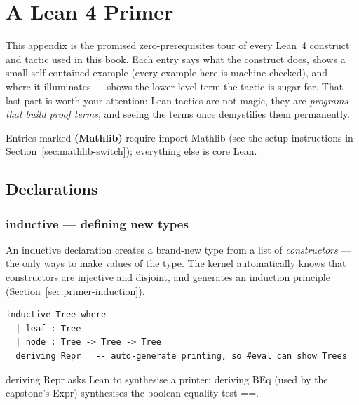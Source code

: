 \documentclass[12pt, openany]{book}
\theoremstyle{plain}
\theoremstyle{definition}
\theoremstyle{remark}
\newcommand{\li}[1]{{\ttfamily\small\color{tealaccent}#1}}
\begin{document}
\appendix

\chapter{A Lean 4 Primer}\label{app:primer}
\color{black}

This appendix is the promised zero-prerequisites tour of every Lean~4 construct and tactic used in this book.  Each entry says what the construct does, shows a small self-contained example (every example here is machine-checked), and --- where it illuminates --- shows the lower-level term the tactic is sugar for.  That last part is worth your attention: Lean tactics are not magic, they are \emph{programs that build proof terms}, and seeing the terms once demystifies them permanently.

Entries marked \textbf{(Mathlib)} require \li{import Mathlib} (see the setup instructions in Section~\ref{sec:mathlib-switch}); everything else is core Lean.

\section{Declarations}

\subsection*{\li{inductive} --- defining new types}

An \li{inductive} declaration creates a brand-new type from a list of \emph{constructors} --- the only ways to make values of the type.  The kernel automatically knows that constructors are injective and disjoint, and generates an induction principle (Section~\ref{sec:primer-induction}).

\begin{leanbox}
\begin{lstlisting}
inductive Tree where
  | leaf : Tree
  | node : Tree -> Tree -> Tree
  deriving Repr   -- auto-generate printing, so #eval can show Trees
\end{lstlisting}
\end{leanbox}
\color{black}

\li{deriving Repr} asks Lean to synthesise a printer; \li{deriving BEq} (used by the capstone's \li{Expr}) synthesises the boolean equality test \li{==}.
\end{document}
